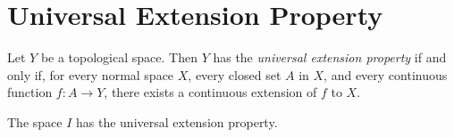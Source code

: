 \section{Universal Extension Property}

\begin{definition}
    Let $Y$ be a topological space. Then $Y$ has the \emph{universal extension property}
    if and only if, for every normal space $X$, every closed set $A$ in $X$, and every
    continuous function $f : A \rightarrow Y$, there exists a continuous extension of
    $f$ to $X$.
\end{definition}

\begin{theorem}
    \label{theorem:tietze}
    The space $I$ has the universal extension property.
\end{theorem}

